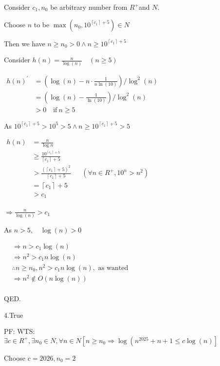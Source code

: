 \documentclass[12pt]{article}
\begin{document}
Consider $c_{1}, n_{0}$ be arbitrary number from $R^{+}$and $N$.

Choose $n$ to be $\max \left(n_{0}, 10^{\left\lceil c_1\right\rceil+5}\right) \in N$

Then we have $n \geq n_{0}>0  \wedge n \geq 10^{\left\lceil c_1\right\rceil+5}$

Consider $h(n)=\frac{n}{\log (n)} \quad(n \geq 5)$

$
\begin{aligned}
h(n)^{\prime} & =\left(\log (n)-n \cdot \frac{1}{n \ln {(10)}}\right) / \log ^{2}(n) \\
& =\left(\log (n)-\frac{1}{\ln {(10)}}\right) / \log ^{2}(n)\\
&>0 \quad \text{if}~n \geq 5
\end{aligned}
$

As $10^{\left\lceil c_1\right\rceil+5}>10^{5}>5 \wedge n \geq 10^{\left\lceil c_1\right\rceil+5}>5$ 

$
\begin{aligned}
h(n) & = \frac{n}{\log n} \\
& \geq \frac{10^{\left\lceil c_1\right\rceil+5}}{\left\lceil c_1\right\rceil+5} \\
& > \frac{(\left\lceil c_1\right\rceil+5)^2}{\left\lceil c_1\right\rceil+5} & & (\forall  n \in R^+, 10^n > n^2)\\
& = \left\lceil c_1\right\rceil+5 \\
&> c_1\\
\end{aligned}
$

$ \Rightarrow \frac{n}{\log (n)}>c_{1}$ 


As $n>5, \quad \log (n)>0$

$
\begin{aligned}
& \Rightarrow n>c_{1} \log (n) \\
& \Rightarrow n^{2}>c_{1} n \log (n) \\
& \therefore n \geq n_{0}, n^{2}>c_1 n\log (n), \text { as wanted } \\
& \Rightarrow n^{2} \notin O(n  \log (n)) \\
\end{aligned}
$

QED.

4.True


PF: WTS: $\exists c \in R^{+}, \exists n_{0} \in N, \forall n \in N\left[n \geq n_{0} \Rightarrow \log \left(n^{2025}+n+1 \leq c \log (n)\right]\right.$

Choose $c=2026, n_{0}=2$
\end{document}
